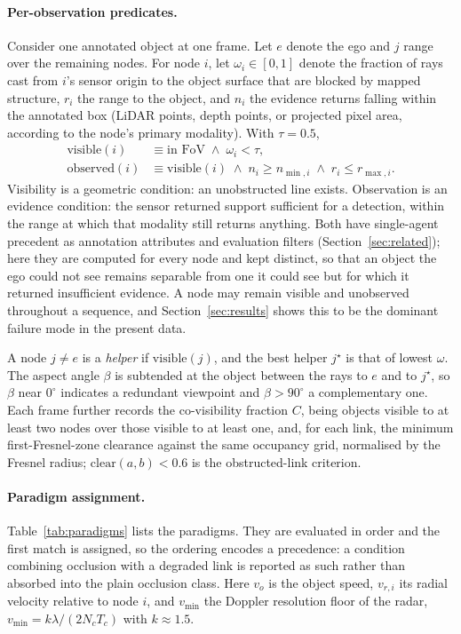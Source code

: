 \paragraph{Per-observation predicates.}
Consider one annotated object at one frame. Let $e$ denote the ego and $j$ range
over the remaining nodes. For node $i$, let $\omega_i \in [0,1]$ denote the
fraction of rays cast from $i$'s sensor origin to the object surface that are
blocked by mapped structure, $r_i$ the range to the object, and $n_i$ the
evidence returns falling within the annotated box (LiDAR points, depth points,
or projected pixel area, according to the node's primary modality). With
$\tau = 0.5$,
%
\begin{align}
\mathrm{visible}(i) &\equiv \text{in FoV} \;\wedge\; \omega_i < \tau,
\label{eq:visible}\\
\mathrm{observed}(i) &\equiv \mathrm{visible}(i) \;\wedge\; n_i \ge n_{\min,i}
\;\wedge\; r_i \le r_{\max,i}.
\label{eq:observed}
\end{align}
%
Visibility is a geometric condition: an unobstructed line exists. Observation is
an evidence condition: the sensor returned support sufficient for a detection,
within the range at which that modality still returns anything. Both have
single-agent precedent as annotation attributes and evaluation filters
(Section~\ref{sec:related}); here they are computed for every node and kept
distinct, so that an object the ego could not see remains separable from one it
could see but for which it returned insufficient evidence. A node may remain
visible and unobserved throughout a sequence, and Section~\ref{sec:results}
shows this to be the dominant failure mode in the present data.

A node $j \ne e$ is a \textit{helper} if $\mathrm{visible}(j)$, and the best
helper $j^\star$ is that of lowest $\omega$. The aspect angle $\beta$ is
subtended at the object between the rays to $e$ and to $j^\star$, so $\beta$
near $0^\circ$ indicates a redundant viewpoint and $\beta > 90^\circ$ a
complementary one. Each frame further records the co-visibility fraction $C$,
being objects visible to at least two nodes over those visible to at least one,
and, for each link, the minimum first-Fresnel-zone clearance against the same
occupancy grid, normalised by the Fresnel radius; $\mathrm{clear}(a,b) < 0.6$
is the obstructed-link criterion.

\paragraph{Paradigm assignment.}
Table~\ref{tab:paradigms} lists the paradigms. They are evaluated in order and
the first match is assigned, so the ordering encodes a precedence: a condition
combining occlusion with a degraded link is reported as such rather than
absorbed into the plain occlusion class. Here $v_o$ is the object speed,
$v_{r,i}$ its radial velocity relative to node $i$, and $v_{\min}$ the Doppler
resolution floor of the radar, $v_{\min} = k\lambda / (2 N_c T_c)$ with
$k \approx 1.5$.

